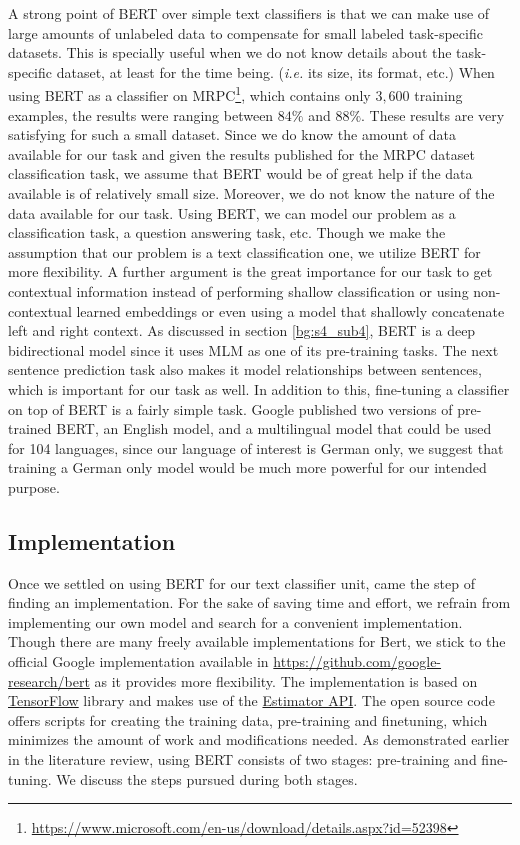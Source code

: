  A strong point of \ac{BERT} over simple text classifiers is that we can make use of large amounts of unlabeled data to compensate for small labeled task-specific datasets. This is specially useful when we do not know details about the task-specific dataset, at least for the time being. (\textit{i.e.} its size, its format, etc.) When using \ac{BERT} as a classifier on \ac{MRPC}\footnote{\url{https://www.microsoft.com/en-us/download/details.aspx?id=52398}}, which contains only $3,600$ training examples, the results were ranging between $84\%$ and $88\%$. These results are very satisfying for such a small dataset. Since we do know the amount of data available for our task and given the results published for the \ac{MRPC} dataset classification task, we assume that \ac{BERT} would be of great help if the data available is of relatively small size. Moreover, we do not know the nature of the data available for our task. Using \ac{BERT}, we can model our problem as a classification task, a question answering task, etc. Though we make the assumption that our problem is a text classification one, we utilize \ac{BERT} for more flexibility. A further argument is the great importance for our task to get contextual information instead of performing shallow classification or using non-contextual learned embeddings or even using a model that shallowly concatenate left and right context. As discussed in section \ref{bg:s4_sub4}, \ac{BERT} is a deep bidirectional model since it uses \acf{MLM} as one of its pre-training tasks. The next sentence prediction task also makes it model relationships between sentences, which is important for our task as well. In addition to this, fine-tuning a classifier on top of \ac{BERT} is a fairly simple task. Google published two versions of pre-trained \ac{BERT}, an English model, and a multilingual model that could be used for 104 languages, since our language of interest is German only, we suggest that training a German only model would be much more powerful for our intended purpose.

\subsection{Implementation}
\label{meth:s5_sub2}

Once we settled on using \ac{BERT} for our text classifier unit, came the step of finding an implementation. For the sake of saving time and effort, we refrain from implementing our own model and search for a convenient implementation. Though there are many freely available implementations for Bert, we stick to the official Google implementation available in \url{https://github.com/google-research/bert} as it provides more flexibility. The implementation is based on \href{https://www.tensorflow.org/}{TensorFlow} library and makes use of the \href{https://www.tensorflow.org/api_docs/python/tf/estimator/Estimator}{Estimator API}. The open source code offers scripts for creating the training data, pre-training and finetuning, which minimizes the amount of work and modifications needed. As demonstrated earlier in the literature review, using \ac{BERT} consists of two stages: pre-training and fine-tuning. We discuss the steps pursued during both stages.

